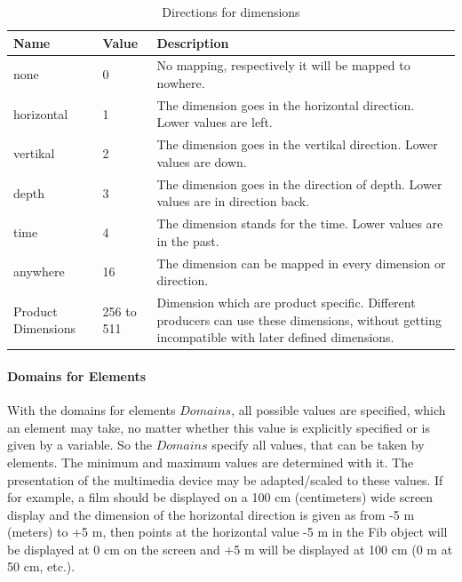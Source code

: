 \begin{table}[htbp]
\begin{center}
\begin{tabular}{|p{35mm}|p{10mm}|p{80mm}|}\hline
	Name & Value & Description \\\hline\hline
	none & 0 & No mapping, respectively it will be mapped to nowhere. \\\hline
	horizontal & 1 & The dimension goes in the horizontal direction. Lower values are left. \\\hline
	vertikal & 2 & The dimension goes in the vertikal direction. Lower values are down. \\\hline
	depth & 3 & The dimension goes in the direction of depth. Lower values are in direction back. \\\hline
	time & 4 & The dimension stands for the time. Lower values are in the past.\\\hline
	anywhere & 16 & The dimension can be mapped in every dimension or direction.\\\hline

	Product Dimensions & 256 to 511 & Dimension which are product specific. Different producers can use these dimensions, without getting incompatible with later defined dimensions. \\\hline


\end{tabular} 
\end{center}
\caption{Directions for dimensions}
\label{tableDimmapValues}
\end{table}


\paragraph{Domains for Elements}
\label{secDomainsForElements}

With the domains for elements $Domains$, all possible values are specified, which an element may take, no matter whether this value is explicitly specified or is given by a variable. So the $Domains$ specify all values, that can be taken by elements. The minimum and maximum values are determined with it. The presentation of the multimedia device may be adapted/scaled to these values. If for example, a film should be displayed on a 100 cm (centimeters) wide screen display and the dimension of the horizontal direction is given as from -5 m (meters) to +5 m, then points at the horizontal value -5 m in the Fib object will be displayed at 0 cm on the screen and +5 m will be displayed at 100 cm (0 m at 50 cm, etc.).

